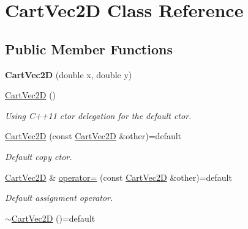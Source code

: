 \hypertarget{class_cart_vec2_d}{}\section{Cart\+Vec2D Class Reference}
\label{class_cart_vec2_d}
\subsection*{Public Member Functions}
\begin{DoxyCompactItemize}
\item 
{\bfseries Cart\+Vec2D} (double x, double y)\hypertarget{class_cart_vec2_d_a331773f726723eafc4ddbaff10195946}{}\label{class_cart_vec2_d_a331773f726723eafc4ddbaff10195946}

\item 
\hyperlink{class_cart_vec2_d_a3096b2d8c025290a5e30633000bbb315}{Cart\+Vec2D} ()\hypertarget{class_cart_vec2_d_a3096b2d8c025290a5e30633000bbb315}{}\label{class_cart_vec2_d_a3096b2d8c025290a5e30633000bbb315}

\begin{DoxyCompactList}\small\item\em Using C++11 ctor delegation for the default ctor. \end{DoxyCompactList}\item 
\hyperlink{class_cart_vec2_d_a4f749e7595a1835b4b9eb5c1e3ddc2ae}{Cart\+Vec2D} (const \hyperlink{class_cart_vec2_d}{Cart\+Vec2D} \&other)=default\hypertarget{class_cart_vec2_d_a4f749e7595a1835b4b9eb5c1e3ddc2ae}{}\label{class_cart_vec2_d_a4f749e7595a1835b4b9eb5c1e3ddc2ae}

\begin{DoxyCompactList}\small\item\em Default copy ctor. \end{DoxyCompactList}\item 
\hyperlink{class_cart_vec2_d}{Cart\+Vec2D} \& \hyperlink{class_cart_vec2_d_a103b408052d6d796c0ff71c74d1d4d8f}{operator=} (const \hyperlink{class_cart_vec2_d}{Cart\+Vec2D} \&other)=default\hypertarget{class_cart_vec2_d_a103b408052d6d796c0ff71c74d1d4d8f}{}\label{class_cart_vec2_d_a103b408052d6d796c0ff71c74d1d4d8f}

\begin{DoxyCompactList}\small\item\em Default assignment operator. \end{DoxyCompactList}\item 
\hyperlink{class_cart_vec2_d_aa0077dfbcf1d52db2c6a4e6b68c12b31}{$\sim$\+Cart\+Vec2D} ()=default\hypertarget{class_cart_vec2_d_aa0077dfbcf1d52db2c6a4e6b68c12b31}{}\label{class_cart_vec2_d_aa0077dfbcf1d52db2c6a4e6b68c12b31}


\end{DoxyCompactItemize}
